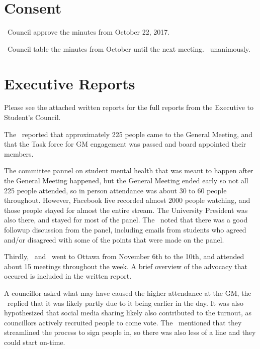 \section*{Consent}

\begin{motion}
    \birt\ Council approve the minutes from October 22, 2017.

    \begin{motion}
        \birt\ Council table the minutes from October until the next meeting.
        \movers{\tristan}{\brian}
        \carries\ unanimously.
    \end{motion}
\end{motion}

\section*{Executive Reports}

Please see the attached written reports for the full reports from the Executive
to Student's Council. 

\begin{information}
    The \pres\ reported that approximately 225 people came to the General 
    Meeting, and that the Task force for GM engagement was passed and board
    appointed their members.
    
    The committee pannel on student mental health that was meant to happen
    after the General Meeting happened, but the General Meeting ended early so 
    not all 225 people attended, so in person attendance was about 30 to 60 
    people throughout. However, Facebook live recorded almost 2000 people 
    watching, and those people stayed for almost the entire stream. The
    University President was also there, and stayed for most of the
    panel. The \pres\ noted that there was a good followup discussion from the 
    panel, including emails from students who agreed and/or disagreed with some
    of the points that were made on the panel.

    Thirdly, \antonio\ and \andrewc\ went to Ottawa from November 6th to the 
    10th, and attended about 15 meetings throughout the week. A brief overview
    of the advocacy that occured is included in the written report. 

    A councillor asked what may have caused the higher attendance at the GM,
    the \pres\ replied that it was likely partly due to it being earlier in 
    the day. It was also hypothesized that social media sharing likely also 
    contributed to the turnout, as councillors actively recruited people to 
    come vote. The \vpof\ mentioned that they streamlined the process to sign
    people in, so there was also less of a line and they could start on-time.

\end{information}

